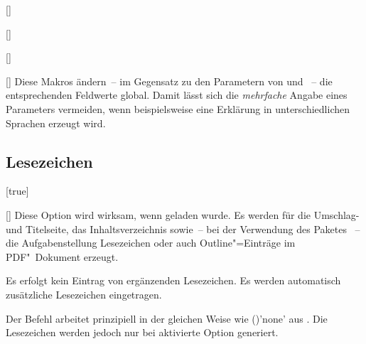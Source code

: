 \begin{Declaration*}{}
\begin{Declaration*}{}
\begin{Declaration*}{}
\begin{Declaration}{[]}
\begin{Declaration}{[]}
\begin{Declaration}{[]}
\begin{Declaration}{[]}
\printdeclarationlist%
%
Diese Makros ändern~-- im Gegensatz zu den Parametern von 
 und ~-- die entsprechenden Feldwerte 
global. Damit lässt sich die \emph{mehrfache} Angabe eines Parameters 
vermeiden, wenn beispielsweise eine Erklärung in unterschiedlichen Sprachen 
erzeugt wird. 
%
%
\end{Declaration}
\end{Declaration}
\end{Declaration}
\end{Declaration}


\subsection{Lesezeichen}
%
%
\begin{Declaration}{}[true]%
\begin{Declaration}{%
  []%
}%
\printdeclarationlist%
%
%
%
%
%
%
%
Diese Option wird wirksam, wenn  geladen wurde. Es werden für 
die Umschlag- und Titelseite, das Inhaltsverzeichnis sowie~-- bei der 
Verwendung des Paketes ~-- die Aufgabenstellung 
Lesezeichen oder auch Outline"=Einträge im PDF"~Dokument erzeugt.
%
\begin{values}{}
\itemfalse
  Es erfolgt kein Eintrag von ergänzenden Lesezeichen.
\itemtrue*
  Es werden automatisch zusätzliche Lesezeichen eingetragen.
\end{values}
%
Der Befehl  arbeitet prinzipiell in der gleichen Weise wie 
()'none' aus . Die 
Lesezeichen werden jedoch nur bei aktivierte Option  
generiert.
\end{Declaration}
\end{Declaration}




\end{Declaration*}
\end{Declaration*}
\end{Declaration*}
